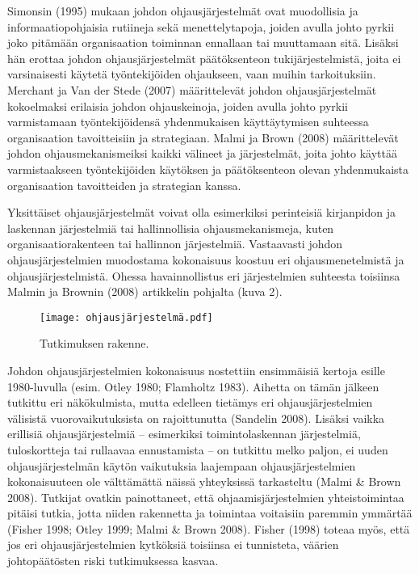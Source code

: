 \documentclass[12pt,a4paper,oneside,pdftex]{report}
\begin{document}
Simonsin (1995) mukaan johdon ohjausjärjestelmät ovat muodollisia ja informaatiopohjaisia rutiineja sekä menettelytapoja, joiden avulla johto pyrkii joko pitämään organisaation toiminnan ennallaan tai muuttamaan sitä. Lisäksi hän erottaa johdon ohjausjärjestelmät päätöksenteon tukijärjestelmistä, joita ei varsinaisesti käytetä työntekijöiden ohjaukseen, vaan muihin tarkoituksiin. Merchant ja Van der Stede (2007) määrittelevät johdon ohjausjärjestelmät kokoelmaksi erilaisia johdon ohjauskeinoja, joiden avulla johto pyrkii varmistamaan työntekijöidensä yhdenmukaisen käyttäytymisen suhteessa organisaation tavoitteisiin ja strategiaan. Malmi ja Brown (2008) määrittelevät johdon ohjausmekanismeiksi kaikki välineet ja järjestelmät, joita johto käyttää varmistaakseen työntekijöiden käytöksen ja päätöksenteon olevan yhdenmukaista organisaation tavoitteiden ja strategian kanssa. 

Yksittäiset ohjausjärjestelmät voivat olla esimerkiksi perinteisiä kirjanpidon ja laskennan järjestelmiä tai hallinnollisia ohjausmekanismeja, kuten organisaatiorakenteen tai hallinnon järjestelmiä. Vastaavasti johdon ohjausjärjestelmien muodostama kokonaisuus koostuu eri ohjausmenetelmistä ja ohjausjärjestelmistä. Ohessa havainnollistus eri järjestelmien suhteesta toisiinsa Malmin ja Brownin (2008) artikkelin pohjalta (kuva 2).

\begin{figure}[ht]
  \begin{center}
    \texttt{[image: ohjausjärjestelmä.pdf]}
    \caption{Tutkimuksen rakenne.}
    \label{fig:rakenne}
  \end{center}
\end{figure}

Johdon ohjausjärjestelmien kokonaisuus nostettiin ensimmäisiä kertoja esille 1980-luvulla (esim. Otley 1980; Flamholtz 1983). Aihetta on tämän jälkeen tutkittu eri näkökulmista, mutta edelleen tietämys eri ohjausjärjestelmien välisistä vuorovaikutuksista on rajoittunutta (Sandelin 2008). Lisäksi vaikka erillisiä ohjausjärjestelmiä – esimerkiksi toimintolaskennan järjestelmiä, tuloskortteja tai rullaavaa ennustamista – on tutkittu melko paljon, ei uuden ohjausjärjestelmän käytön vaikutuksia laajempaan ohjausjärjestelmien kokonaisuuteen ole välttämättä näissä yhteyksissä tarkasteltu (Malmi & Brown 2008). Tutkijat ovatkin painottaneet, että ohjaamisjärjestelmien yhteistoimintaa pitäisi tutkia, jotta niiden rakennetta ja toimintaa voitaisiin paremmin ymmärtää (Fisher 1998; Otley 1999; Malmi & Brown 2008). Fisher (1998) toteaa myös, että jos eri ohjausjärjestelmien kytköksiä toisiinsa ei tunnisteta, väärien johtopäätösten riski tutkimuksessa kasvaa.
\end{document}

